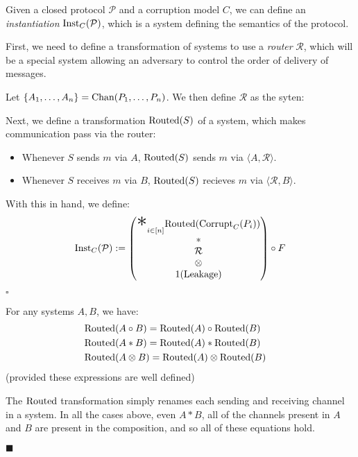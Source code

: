 \begin{definition}[Instantiation]
  Given a closed protocol $\mathcal{P}$ and a corruption model $C$, we can
  define an \emph{instantiation} $\text{Inst}_C(\mathcal{P})$, which
  is a system defining the semantics of the protocol.

  First, we need to define a transformation of systems to use
  a \emph{router} $\mathcal{R}$, which will be a special system
  allowing an adversary to control the order of delivery of messages.

  Let $\{A_1, \ldots, A_n\} = \text{Chan}(P_1, \ldots, P_n)$.
  We then define $\mathcal{R}$ as the syten:

  Next, we define a transformation $\text{Routed}(S)$ of a system,
  which makes communication pass via the router:
  \begin{itemize}
    \item Whenever $S$ sends $m$ via $A$, $\text{Routed}(S)$ sends $m$ via $\langle A , \mathcal{R} \rangle$.
    \item Whenever $S$ receives $m$ via $B$, $\text{Routed}(S)$ recieves $m$ via $\langle \mathcal{R}, B \rangle$.
  \end{itemize}

With this in hand, we define:
$$
\tx{Inst}_C(\mathcal{P}) :=
  \begin{pmatrix}
    {\displaystyle \bigast}_{i \in [n]} \tx{Routed}(\tx{Corrupt}_C(P_i))\cr
    *\cr
    \mathcal{R}\cr
    \otimes\cr
    1(\tx{Leakage})
  \end{pmatrix}
  \circ F
$$


$\square$
\end{definition}

\begin{lemma}
  \label{thm:routed}
  For any systems $A, B$, we have:
$$
\begin{aligned}
  &\text{Routed}(A \circ B) = \text{Routed}(A) \circ \text{Routed}(B)\cr
  &\text{Routed}(A * B) = \text{Routed}(A) * \text{Routed}(B)\cr
  &\text{Routed}(A \otimes B) = \text{Routed}(A) \otimes \text{Routed}(B)\cr
\end{aligned}
$$
(provided these expressions are well defined)

 The $\text{Routed}$ transformation simply
renames each sending and receiving channel in a system.
In all the cases above, even $A * B$, all of the channels present
in $A$ and $B$ are present in the composition, and so all
of these equations hold.

$\blacksquare$
\end{lemma}


